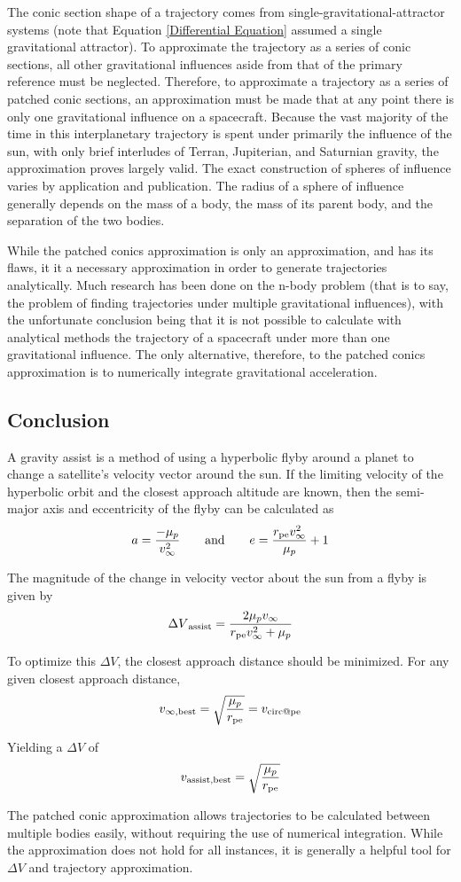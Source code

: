 \documentclass[../basicOrbitalDynamics.tex]{subfiles}
\begin{document}
The conic section shape of a trajectory comes from single-gravitational-attractor systems (note that Equation \eqref{Differential Equation} assumed a single gravitational attractor). To approximate the trajectory as a series of conic sections, all other gravitational influences aside from that of the primary reference must be neglected. Therefore, to approximate a trajectory as a series of patched conic sections, an approximation must be made that at any point there is only one gravitational influence on a spacecraft. Because the vast majority of the time in this interplanetary trajectory is spent under primarily the influence of the sun, with only brief interludes of Terran, Jupiterian, and Saturnian gravity, the approximation proves largely valid. The exact construction of spheres of influence varies by application and publication. The radius of a sphere of influence generally depends on the mass of a body, the mass of its parent body, and the separation of the two bodies.

While the patched conics approximation is only an approximation, and has its flaws, it it a necessary approximation in order to generate trajectories analytically. Much research has been done on the n-body problem (that is to say, the problem of finding trajectories under multiple gravitational influences), with the unfortunate conclusion being that it is not possible to calculate with analytical methods the trajectory of a spacecraft under more than one gravitational influence. The only alternative, therefore, to the patched conics approximation is to numerically integrate gravitational acceleration.

\bigskip\bigskip
\subsection{Conclusion}

A gravity assist is a method of using a hyperbolic flyby around a planet to change a satellite's velocity vector around the sun. If the limiting velocity of the hyperbolic orbit and the closest approach altitude are known, then the semi-major axis and eccentricity of the flyby can be calculated as
$$a=\frac{-\mu_p}{v_\infty^2}\qquad\text{and}\qquad e=\frac{{r}_\text{pe}v_\infty^2}{\mu_p}+1$$

The magnitude of the change in velocity vector about the sun from a flyby is given by
$${\Delta V}_\text{assist}=\frac{2\mu_p v_\infty}{{r}_\text{pe}v_\infty^2+\mu_p}$$

To optimize this $\Delta V$, the closest approach distance should be minimized. For any given closest approach distance,
$$v_{\infty,\text{best}}=\sqrt{\frac{\mu_p}{{r}_\text{pe}}}={v}_\text{circ@pe}$$

Yielding a $\Delta V$ of
$${v}_\text{assist,best} = \sqrt{\frac{\mu_p}{{r}_\text{pe}}}$$

The patched conic approximation allows trajectories to be calculated between multiple bodies easily, without requiring the use of numerical integration. While the approximation does not hold for all instances, it is generally a helpful tool for $\Delta V$ and trajectory approximation.
\end{document}
